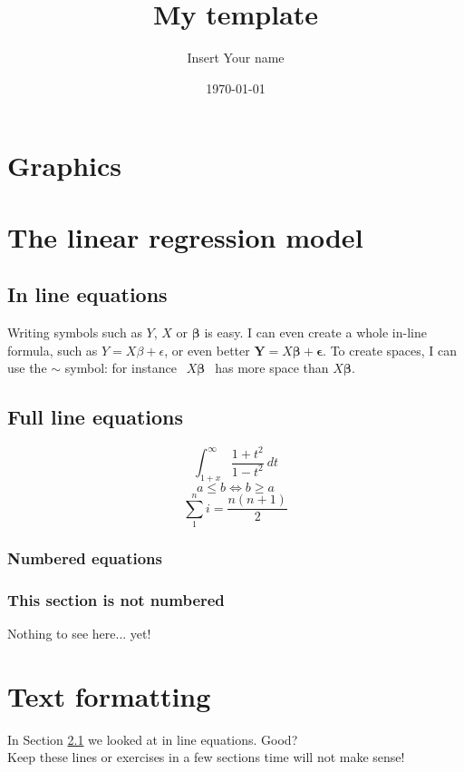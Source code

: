 \documentclass[11pt]{article}
\title{My template}
\author{Insert Your name}
\date{\today}
\begin{document}
\maketitle
\section{Graphics}
\section{The linear regression model}
\subsection{In line equations}
\label{sect.myfirst}
Writing symbols such as $Y$, $X$ or $\boldsymbol{\beta}$ is easy. I can
even create a whole in-line formula, such as $Y=X\beta+\epsilon$, or even better
$\textbf{Y}=X\boldsymbol{\beta}+\boldsymbol{\epsilon}$. To create spaces,
I can use the $\sim$ symbol: for instance $~~X\boldsymbol\beta~~$ has more
space than $X\boldsymbol\beta$.
\subsection{Full line equations}
\[
\int_{1+x}^\infty{\frac{1+t^2}{1-t^2}~dt}
\]
\[
a \leq b \Leftrightarrow b \geq a
\]
\[
\sum_{1}^{n}i=\frac{n(n+1)}{2}
\]
\subsubsection{Numbered equations}
\subsubsection*{This section is not numbered}
Nothing to see here... yet!
\section{Text formatting}
In Section \ref{sect.myfirst} we looked at in line equations.
Good?\\ Keep these lines or exercises in a few
sections time will not make sense!
\end{document}
